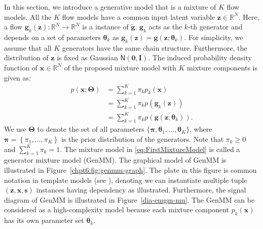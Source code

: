In this section, we introduce a generative model that is a mixture of $K$ flow models. All the $K$ flow models have a common input latent variable $\bm{z} \in \mathbb{R}^N$. Here, a flow $\bm{g}_k(\bm{z}): \mathbb{R}^N
\rightarrow \mathbb{R}^N$ is a instance of $\tilde{\bm{g}}$. $\bm{g}_k$ acts as the $k$-th generator and depends on a set of parameters $\bm{\theta}_k$ as
$\bm{g}_k(\bm{z})=\bm{g}(\bm{z};\boldsymbol{\theta}_k)$. For
simplicity, we assume that all $K$ generators have the same
chain structure. Furthermore, the distribution of $\bm{z}$ is fixed as Gaussian $\mathsf{N}(\bm{0},\bm{I})$.
The induced probability density function of $\bm{x} \in \mathbb{R}^N$ of the proposed mixture model with $K$ mixture components is given as:
\begin{align}\label{eq:FirstMixtureModel}
  p(\bm{x};\bm{\Theta})  &= \textstyle\sum_{k=1}^K \pi_k  p_k(\bm{x}) \nonumber\\
                         &= \textstyle \sum_{k=1}^K \pi_k  p(\bm{g}_k(\bm{z}))\nonumber\\
                         &= \textstyle \sum_{k=1}^K \pi_k  p(\bm{g}(\bm{z};\boldsymbol{\theta}_k)).
\end{align}
We use $\bm{\Theta}$ to denote the set of all parameters $ \{\bm{\pi},\bm{\theta}_1, \dots, \bm{\theta}_K \}$, where $\bm{\pi} = \left\{ \pi_1, \hdots, \pi_K \right\}$ is the prior distribution of the generators. Note that $\pi_k \geq 0$ and $\sum_{k=1}^K \pi_k =1$. The mixture model
in \eqref{eq:FirstMixtureModel} is called a generator mixture model (GenMM). The graphical model of GenMM is illustrated in Figure~\ref{chpt6:fig:genmm-graph}. The plate in this figure is common notation in template models (see \cite[section~6]{koller2009pgm}), denoting we can instantiate multiple tuple $(\bm{z}, \bm{x}, \bm{s})$ instances having dependency as illustrated. Furthermore, the
signal diagram of GenMM is illustrated in Figure~\ref{dia-emgm-nm}. The GenMM can be considered as a high-complexity model because each mixture component $p_k(\bm{x})$ has its own parameter set $\bm{\theta}_k$. 

